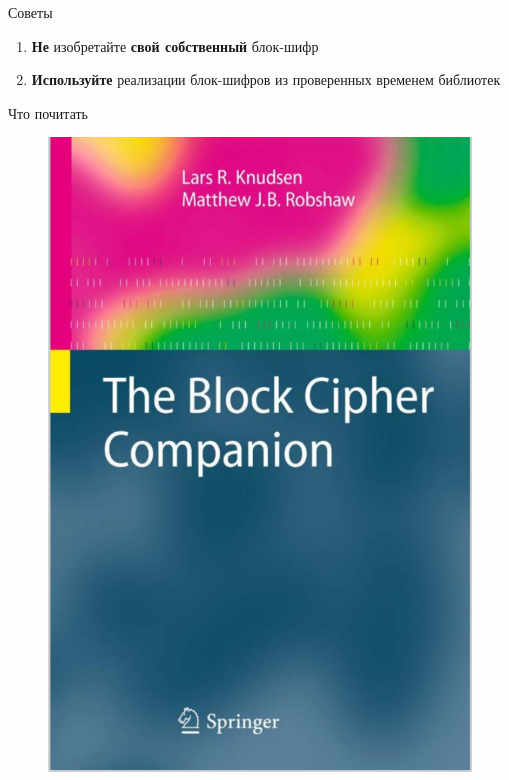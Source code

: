 \documentclass[usenames,dvipsnames,8pt,aspectratio=169]{beamer}
\begin{document}
\begin{frame}{Советы}
\Huge

\begin{enumerate}
\itemsep 1em
\item {\color{Orange}\textbf{Не}} изобретайте {\color{Orange}\textbf{свой собственный}}  блок-шифр
\item {\color{Orange}\textbf{Используйте}} реализации блок-шифров из проверенных временем библиотек

\end{enumerate}
\end{frame}

\begin{frame}{Что почитать}
	\begin{figure}
		\includegraphics[height=0.7\textheight]{Book_cover}
	\end{figure}
\end{frame}
\end{document}
